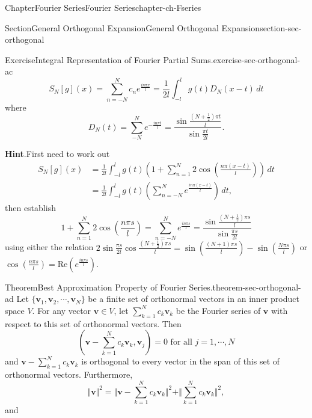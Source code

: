\documentclass[oneside,10pt,]{book}
\newcommand{\blocktitlefont}{\relax}
\numberwithin{equation}{section}
\newcommand{\bv}{\mathbf{v}}
\newcommand{\amp}{&}
\begin{document}
\begin{chapterptx}{Chapter}{Fourier Series}{}{Fourier Series}{}{}{chapter-ch-Fseries}
\begin{sectionptx}{Section}{General Orthogonal Expansion}{}{General Orthogonal Expansion}{}{}{section-sec-orthogonal}
\begin{inlineexercise}{Exercise}{Integral Representation of Fourier Partial Sums.}{exercise-sec-orthogonal-ac}
\begin{equation*}
S_{N}[g](x)=\sum_{n=-N}^{N} c_{n} e^{\frac{i n\pi x}{l}}=
\frac{1}{2l} \int_{-l}^{l}g(t) D_{N}(x-t)\, dt
\end{equation*}
where%
\begin{equation*}
D_{N}(t)= \sum_{-N}^{N} e^{-\frac{i n\pi t}{l}}=\frac{\sin \frac{(N+\frac 12)\pi t}{l}}{\sin\frac {\pi t}{2l}}.
\end{equation*}
\par\smallskip%
\noindent\textbf{\blocktitlefont Hint}.\hypertarget{hint-sec-orthogonal-ac-c}{}\quad{}First need to work out%
\begin{align*}
S_{N}[g](x)\amp =\frac{1}{2l} \int_{-l}^{l}g(t) \left(1 + \sum_{n=1}^{N} 2 \cos\left(\frac{n\pi (x-t)}{l}\right)\right)\, dt\\
\amp = \frac{1}{2l} \int_{-l}^{l}g(t) \left( \sum_{n=-N}^{N} e^{\frac{i n\pi (x-t)}{l}} \right)\, dt\text{,}
\end{align*}
then establish%
\begin{equation*}
1 + \sum_{n=1}^{N} 2 \cos\left(\frac{n\pi s}{l} \right)= \sum_{n=-N}^{N} e^{\frac{i n\pi s}{l}}
=\frac{\sin \frac{(N+\frac 12)\pi s}{l}}{\sin\frac {\pi s}{2l}}
\end{equation*}
using either the relation \(2\sin \frac{\pi s}{2l} \cos  \frac{(N+\frac 12)\pi s}{l} =\sin(\frac{(N+1)\pi s}{l})-\sin(\frac{N\pi s}{l})\) or \(\cos \left(\frac{n\pi s}{l} \right)= \text{Re}(e^{\frac{i n\pi s}{l} })\).\end{inlineexercise}%
\begin{theorem}{Theorem}{Best Approximation Property of Fourier Series.}{}{theorem-sec-orthogonal-ad}%
Let \(\{\bv_{1}, \bv_{2},\cdots, \bv_{N} \}\) be a finite set of orthonormal vectors in an inner product space \(V\). For any vector \(\bv\in V\), let \(\sum_{k=1}^{N} c_{k} \bv_{k}\) be the Fourier series of \(\bv\) with respect to this set of orthonormal vectors. Then%
\begin{equation*}
( \bv - \sum_{k=1}^{N} c_{k} \bv_{k}, \bv_{j})=0 \text{ for all $j=1, \cdots, N$}
\end{equation*}
and \(\bv - \sum_{k=1}^{N} c_{k} \bv_{k}\) is orthogonal to every vector in the span of this set of orthonormal vectors. Furthermore,%
\begin{equation*}
\Vert \bv \Vert^{2}=\Vert \bv - \sum_{k=1}^{N} c_{k} \bv_{k}\Vert^{2}+ \Vert \sum_{k=1}^{N} c_{k} \bv_{k}\Vert^{2},
\end{equation*}
and%
\begin{equation*}

\end{equation*}
\end{theorem}
\end{sectionptx}
\end{chapterptx}
\end{document}
